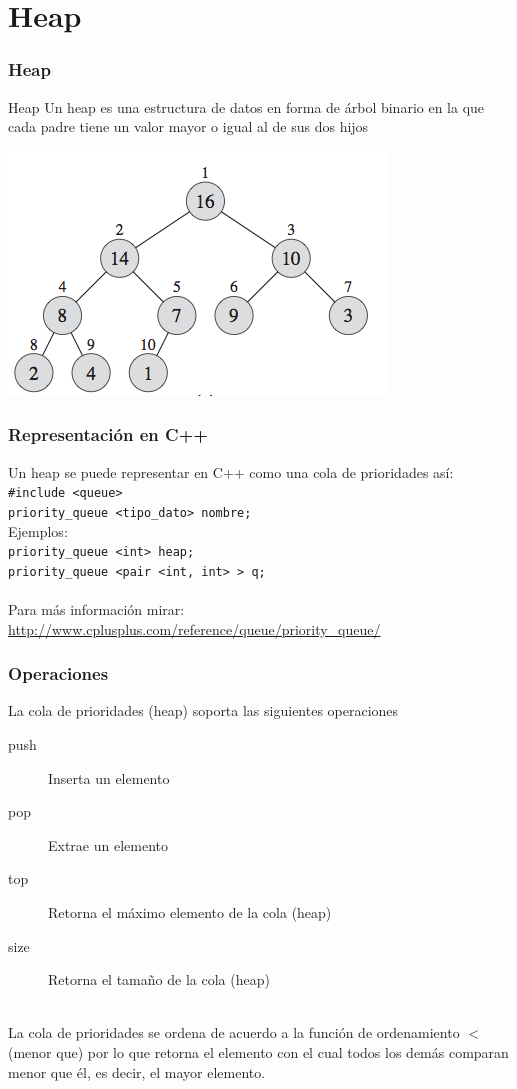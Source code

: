 \documentclass{beamer}
\begin{document}
\section{Heap}
	\begin{frame}
		\frametitle{Heap}
		\begin{block}{Heap}
			Un heap es una estructura de datos en forma de árbol binario en la que cada padre tiene un valor mayor o igual al de sus dos hijos
		\end{block}
		\begin{center}\includegraphics[height = 0.5\textheight]{heap.png} \end{center}
	\end{frame}
	
	\begin{frame}[fragile]
		\frametitle{Representación en C++}
		Un heap se puede representar en C++ como una cola de prioridades así:
		\verb|#include <queue>|\\
		\verb|priority_queue <tipo_dato> nombre;|\\
		Ejemplos:\\
		\verb|priority_queue <int> heap;|\\
		\verb|priority_queue <pair <int, int> > q;|\\
		\quad \\
		Para más información mirar: \url{http://www.cplusplus.com/reference/queue/priority_queue/}
	\end{frame}
	
	
	\begin{frame}
		\frametitle{Operaciones}
		La cola de prioridades (heap) soporta las siguientes operaciones
		\begin{description}
			\item [push] Inserta un elemento
			\item [pop] Extrae un elemento
			\item [top] Retorna el máximo elemento de la cola (heap)
			\item [size] Retorna el tamaño de la cola (heap)
		\end{description}
		\quad \\
		La cola de prioridades se ordena de acuerdo a la función de ordenamiento $<$ (menor que) por lo que retorna el elemento con el cual todos los demás comparan menor que él, es decir, el mayor elemento.
	\end{frame}
	
\end{document}
